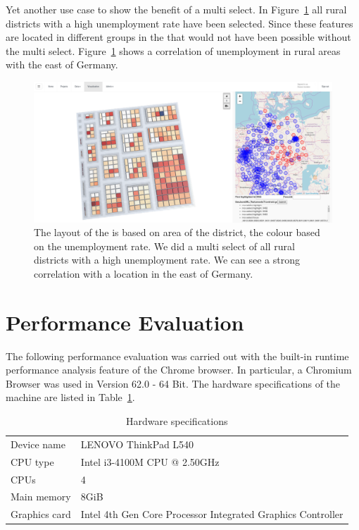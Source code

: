 Yet another use case to show the benefit of a multi select.
In Figure~\ref{fig:evaluation:cases:wahlkreise_multiselect:2} all rural districts with a high unemployment rate have been selected.
Since these features are located in different groups in the \tmap{} that would not have been possible without the multi select.
Figure~\ref{fig:evaluation:cases:wahlkreise_multiselect:2} shows a correlation of unemployment in rural areas with the east of Germany.

\begin{figure}[h]
  \centering
  \includegraphics[width=\textwidth]{figures/evaluation/cases/wahlkreise_multiselect_2}
  \caption{
    The layout of the \tmap{} is based on area of the district, the colour based on the unemployment rate.
    We did a multi select of all rural districts with a high unemployment rate.
    We can see a strong correlation with a location in the east of Germany.
  }\label{fig:evaluation:cases:wahlkreise_multiselect:2}
\end{figure}


\section{Performance Evaluation}

The following performance evaluation was carried out with the built-in runtime performance analysis feature of the Chrome browser.
In particular, a Chromium Browser was used in Version 62.0 - 64 Bit.
The hardware specifications of the machine are listed in Table~\ref{tab:evaluation:performance:hardware}.

\begin{table}[ht]
  \centering
  \begin{tabular}{ll}
    Device name & LENOVO ThinkPad L540 \\
    CPU type & Intel i3-4100M CPU @ 2.50GHz \\
    CPUs & 4 \\
    Main memory & 8GiB \\
    Graphics card & Intel 4th Gen Core Processor Integrated Graphics Controller \\
  \end{tabular}
  \caption{Hardware specifications}%
  \label{tab:evaluation:performance:hardware}
\end{table}

